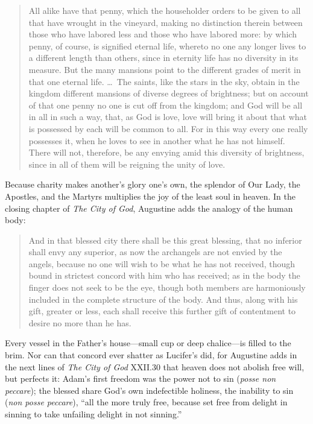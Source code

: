 \begin{quote}
All alike have that penny, which the householder orders to be given to all that have wrought in the vineyard, making no distinction therein between those who have labored less and those who have labored more: by which penny, of course, is signified eternal life, whereto no one any longer lives to a different length than others, since in eternity life has no diversity in its measure. But the many mansions point to the different grades of merit in that one eternal life. \dots\ The saints, like the stars in the sky, obtain in the kingdom different mansions of diverse degrees of brightness; but on account of that one penny no one is cut off from the kingdom; and God will be all in all in such a way, that, as God is love, love will bring it about that what is possessed by each will be common to all. For in this way every one really possesses it, when he loves to see in another what he has not himself. There will not, therefore, be any envying amid this diversity of brightness, since in all of them will be reigning the unity of love.
\end{quote}

Because charity makes another's glory one's own, the splendor of Our Lady, the Apostles, and the Martyrs multiplies the joy of the least soul in heaven. In the closing chapter of \textit{The City of God}, Augustine adds the analogy of the human body:

\begin{quote}
And in that blessed city there shall be this great blessing, that no inferior shall envy any superior, as now the archangels are not envied by the angels, because no one will wish to be what he has not received, though bound in strictest concord with him who has received; as in the body the finger does not seek to be the eye, though both members are harmoniously included in the complete structure of the body. And thus, along with his gift, greater or less, each shall receive this further gift of contentment to desire no more than he has.
\end{quote}

Every vessel in the Father's house---small cup or deep chalice---is filled to the brim. Nor can that concord ever shatter as Lucifer's did, for Augustine adds in the next lines of \textit{The City of God} XXII.30 that heaven does not abolish free will, but perfects it: Adam's first freedom was the power not to sin (\textit{posse non peccare}); the blessed share God's own indefectible holiness, the inability to sin (\textit{non posse peccare}), ``all the more truly free, because set free from delight in sinning to take unfailing delight in not sinning.''

